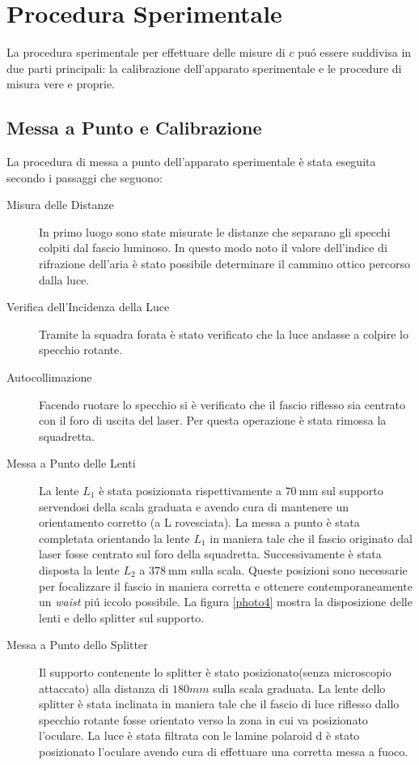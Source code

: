 \documentclass[a4paper,11pt]{article}
\begin{document}
\section{Procedura Sperimentale}

La procedura sperimentale per effettuare delle misure di $c$ pu\'o essere suddivisa in due parti principali: la calibrazione dell'apparato sperimentale e le procedure di misura vere e proprie.

\subsection{Messa a Punto e Calibrazione}

La procedura di messa a punto dell'apparato sperimentale è stata eseguita secondo i passaggi che seguono:

\begin{description}
	\item[Misura delle Distanze] In primo luogo sono state misurate le distanze che separano gli specchi colpiti dal fascio luminoso. In questo modo noto il valore dell'indice di rifrazione dell'aria è stato possibile determinare il cammino ottico percorso dalla luce.
	\item[Verifica dell'Incidenza della Luce] Tramite la squadra forata è stato verificato che la luce andasse a colpire lo specchio rotante.
	\item[Autocollimazione] Facendo ruotare lo specchio si è verificato che il fascio riflesso sia centrato con il foro di uscita del laser. Per questa operazione è stata rimossa la squadretta.
	\item[Messa a Punto delle Lenti] La lente $L_1$ è stata posizionata rispettivamente a $\SI{70}{\milli\meter}$ sul supporto servendosi della scala graduata e avendo cura di mantenere un orientamento corretto (a L rovesciata). La messa a punto è stata completata orientando la lente $L_1$ in maniera tale che il fascio originato dal laser fosse centrato sul foro della squadretta. Successivamente è stata disposta la lente $L_2$ a $\SI{378}{\milli\meter}$ sulla scala. Queste posizioni sono necessarie per focalizzare il fascio in maniera corretta e ottenere contemporaneamente un \textit{waist} pi\'u iccolo possibile. La figura \ref{photo4} mostra la disposizione delle lenti e dello splitter sul supporto.
	\item[Messa a Punto dello Splitter] Il supporto contenente lo splitter è stato posizionato(senza microscopio attaccato) alla distanza di $180mm$ sulla scala graduata. La lente dello splitter è stata inclinata in maniera tale che il fascio di luce riflesso dallo specchio rotante fosse orientato verso la zona in cui va posizionato l'oculare. La luce è stata filtrata con le lamine polaroid d è stato posizionato l'oculare avendo cura di effettuare una corretta messa a fuoco.

\end{description}
\end{document}
